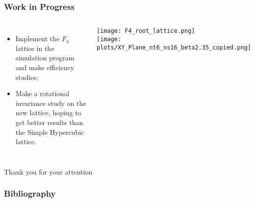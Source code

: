 \documentclass{beamer}
\begin{document}
\begin{frame}
  \frametitle{Work in Progress}
  \begin{columns}
    \begin{itemize}
    \item Implement the $F_4$ lattice in the simulation program and make efficiency studies;
    \vspace{5\baselineskip}
    \item Make a rotational invariance study on the new lattice, hoping to get better results than the Simple Hypercubic lattice.
    \end{itemize}
    
    \texttt{[image: F4\_root\_lattice.png]}\\
    \vspace{\baselineskip}
    \texttt{[image: plots/XY\_Plane\_nt6\_ns16\_beta2.35\_copied.png]}
  \end{columns}
\end{frame}

\begin{frame}
  \centering
  \Huge
  Thank you for your attention
\end{frame}

\begin{frame}[allowframebreaks]
  \frametitle{Bibliography}
  \printbibliography
\end{frame}
\end{document}
